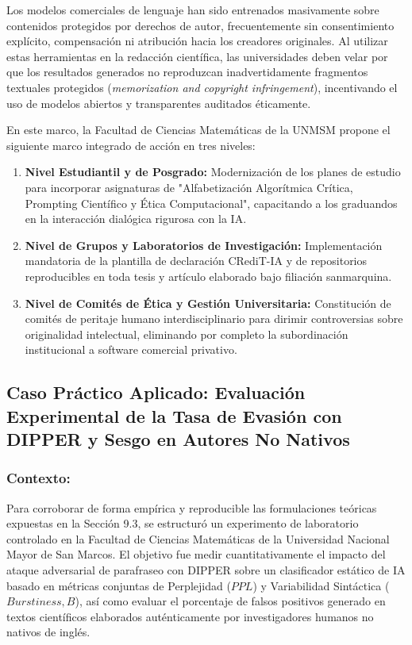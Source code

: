 Los modelos comerciales de lenguaje han sido entrenados masivamente sobre contenidos protegidos por derechos de autor, frecuentemente sin consentimiento explícito, compensación ni atribución hacia los creadores originales. Al utilizar estas herramientas en la redacción científica, las universidades deben velar por que los resultados generados no reproduzcan inadvertidamente fragmentos textuales protegidos (\textit{memorization and copyright infringement}), incentivando el uso de modelos abiertos y transparentes auditados éticamente.

En este marco, la Facultad de Ciencias Matemáticas de la UNMSM propone el siguiente marco integrado de acción en tres niveles:
\begin{enumerate}
    \item \textbf{Nivel Estudiantil y de Posgrado:} Modernización de los planes de estudio para incorporar asignaturas de "Alfabetización Algorítmica Crítica, Prompting Científico y Ética Computacional", capacitando a los graduandos en la interacción dialógica rigurosa con la IA.
    \item \textbf{Nivel de Grupos y Laboratorios de Investigación:} Implementación mandatoria de la plantilla de declaración CRediT-IA y de repositorios reproducibles en toda tesis y artículo elaborado bajo filiación sanmarquina.
    \item \textbf{Nivel de Comités de Ética y Gestión Universitaria:} Constitución de comités de peritaje humano interdisciplinario para dirimir controversias sobre originalidad intelectual, eliminando por completo la subordinación institucional a software comercial privativo.
\end{enumerate}
\subsection{Caso Práctico Aplicado: Evaluación Experimental de la Tasa de Evasión con DIPPER y Sesgo en Autores No Nativos}

\subsubsection*{Contexto:}
Para corroborar de forma empírica y reproducible las formulaciones teóricas expuestas en la Sección 9.3, se estructuró un experimento de laboratorio controlado en la Facultad de Ciencias Matemáticas de la Universidad Nacional Mayor de San Marcos. El objetivo fue medir cuantitativamente el impacto del ataque adversarial de parafraseo con DIPPER sobre un clasificador estático de IA basado en métricas conjuntas de Perplejidad ($PPL$) y Variabilidad Sintáctica ($Burstiness, B$), así como evaluar el porcentaje de falsos positivos generado en textos científicos elaborados auténticamente por investigadores humanos no nativos de inglés.

